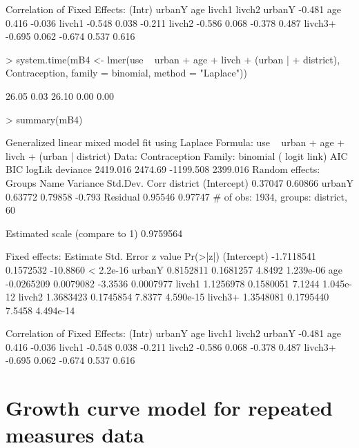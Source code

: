 \documentclass[12pt]{article}
\begin{document}
\begin{Schunk}
\begin{Soutput}
Correlation of Fixed Effects:
        (Intr) urbanY age    livch1 livch2
urbanY  -0.481                            
age      0.416 -0.036                     
livch1  -0.548  0.038 -0.211              
livch2  -0.586  0.068 -0.378  0.487       
livch3+ -0.695  0.062 -0.674  0.537  0.616
\end{Soutput}
\begin{Sinput}
> system.time(mB4 <- lmer(use ~ urban + age + livch + (urban | 
+     district), Contraception, family = binomial, method = "Laplace"))
\end{Sinput}
\begin{Soutput}
[1] 26.05  0.03 26.10  0.00  0.00
\end{Soutput}
\begin{Sinput}
> summary(mB4)
\end{Sinput}
\begin{Soutput}
Generalized linear mixed model fit using Laplace 
Formula: use ~ urban + age + livch + (urban | district) 
   Data: Contraception 
 Family: binomial ( logit link)
      AIC     BIC    logLik deviance
 2419.016 2474.69 -1199.508 2399.016
Random effects:
 Groups   Name        Variance Std.Dev. Corr   
 district (Intercept) 0.37047  0.60866         
          urbanY      0.63772  0.79858  -0.793 
 Residual             0.95546  0.97747         
# of obs: 1934, groups: district, 60

Estimated scale (compare to 1)  0.9759564 

Fixed effects:
              Estimate Std. Error  z value  Pr(>|z|)
(Intercept) -1.7118541  0.1572532 -10.8860 < 2.2e-16
urbanY       0.8152811  0.1681257   4.8492 1.239e-06
age         -0.0265209  0.0079082  -3.3536 0.0007977
livch1       1.1256978  0.1580051   7.1244 1.045e-12
livch2       1.3683423  0.1745854   7.8377 4.590e-15
livch3+      1.3548081  0.1795440   7.5458 4.494e-14

Correlation of Fixed Effects:
        (Intr) urbanY age    livch1 livch2
urbanY  -0.481                            
age      0.416 -0.036                     
livch1  -0.548  0.038 -0.211              
livch2  -0.586  0.068 -0.378  0.487       
livch3+ -0.695  0.062 -0.674  0.537  0.616
\end{Soutput}
\end{Schunk}


\section{Growth curve model for repeated measures data}
\label{sec:GrowthCurve}
\end{document}
